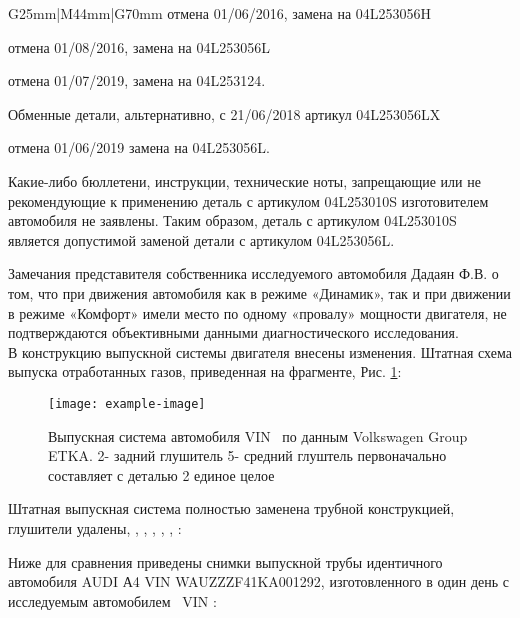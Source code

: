 {\begin{longtable}{G{25mm}|M{44mm}|G{70mm}}
отмена 01/06/2016, замена на 04L253056H   

отмена 01/08/2016, замена на 04L253056L   

отмена 01/07/2019, замена на 04L253124.

Обменные детали,   альтернативно, с 21/06/2018 артикул  04L253056LX 

отмена 01/06/2019  замена на  04L253056L. 

Какие-либо бюллетени, инструкции, технические ноты, запрещающие или не рекомендующие к применению деталь с артикулом 
04L253010S изготовителем автомобиля не заявлены. Таким образом,  деталь с артикулом 04L253010S  является допустимой заменой детали с артикулом 04L253056L.
 
 Замечания представителя собственника исследуемого автомобиля Дадаян Ф.В.  о том, что при движения автомобиля как в режиме «Динамик», так и при движении в режиме «Комфорт» имели место по одному «провалу» мощности двигателя,  не подтверждаются объективными  данными диагностического исследования.\\ 

 В конструкцию выпускной  системы двигателя внесены изменения. Штатная схема выпуска отработанных газов, приведенная на фрагменте, Рис. \ref{fig:gl}:
  \begin{figure}[H]
 	\centering
 	\texttt{[image: example-image]}
 	\caption{Выпускная система автомобиля VIN \vin \, по данным Volkswagen Group ETKA. 2- задний глушитель  5- средний глуштель первоначально составляет с деталью 2 единое целое}
 	\label{fig:gl}
 \end{figure}
 
Штатная выпускная система  полностью заменена трубной конструкцией, глушители удалены, , , , , , :\\
 

\vspace{5mm}

  Ниже для сравнения приведены снимки выпускной трубы  идентичного автомобиля AUDI А4 VIN WAUZZZF41KA001292,  изготовленного в один день с исследуемым автомобилем  \, VIN \vin: %
  

\end{longtable}}

